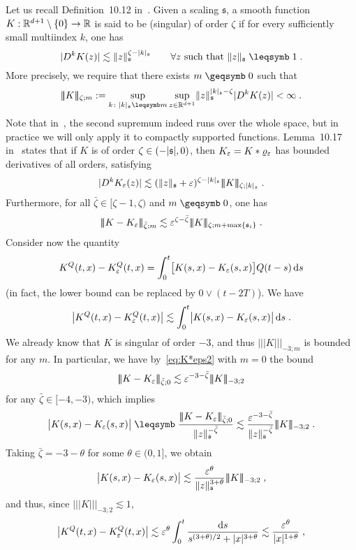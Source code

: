 \documentclass[reqno,11pt]{article}
\def\normDgamma#1{|\!|\!|#1|\!|\!|}
\def\KQ{K^Q}
\def\fraks{\mathfrak{s}}
\begin{document}
Let us recall Definition~10.12 in~\cite{Hairer2014}. Given a scaling
$\fraks$, a smooth function $K: \mathbb{R}^{d+1}\setminus\{0\}\to\mathbb{R}$ is said to be
(singular) of order $\zeta$ if for every sufficiently small multiindex $k$, one
has 
\[
 \abs{D^k K(z)} \lesssim \norm{z}_\fraks^{\zeta - \abs{k}_\fraks}
 \qquad
 \forall z \text{ such that } \norm{z}_\fraks \leqs 1\;.
\]
More precisely, we require that there exists $m\geqs0$ such that 
\[
 \normDgamma{K}_{\zeta;m} := \sup_{k\colon\abs{k}_\fraks \leqs m} 
 \sup_{z\in\R^{d+1}} \norm{z}_\fraks^{\abs{k}_\fraks - \zeta} \abs{D^k K(z)} <
\infty\;.
\]
Note that in~\cite[Def~10.12]{Hairer2014}, the second supremum indeed runs over
the whole space, but in practice we will only apply it to compactly supported
functions. 
Lemma~10.17 in~\cite{Hairer2014} states that if $K$ is of order
$\zeta\in(-\abs{\fraks},0)$, then $K_\varepsilon=K*\varrho_\varepsilon$ has  bounded
derivatives of all orders, satisfying 
\[
 \abs{D^k K_\eps(z)} \lesssim (\norm{z}_\fraks + \eps)^{\zeta-\abs{k}_\fraks}
\normDgamma{K}_{\zeta;\abs{k}_\fraks}\;.
\]
Furthermore, for all $\bar\zeta\in[\zeta-1,\zeta)$ and $m\geqs0$, one has 
\begin{equation}
 \label{eq:K*eps2}
 \normDgamma{K-K_\eps}_{\bar\zeta;m} 
 \lesssim \eps^{\zeta-\bar\zeta} \normDgamma{K}_{\zeta;m+\max\set{\fraks_i}}\;. 
\end{equation} 
%
Consider now the quantity 
\[
 \KQ(t,x) - \KQ_\eps(t,x) 
 = \int_0^t \bigbrak{K(s,x) - K_\eps(s,x)}Q(t-s)\6s 
\]
(in fact, the lower bound can be replaced by $0\vee(t-2T)$). We have 
\[
 \bigabs{\KQ(t,x) - \KQ_\eps(t,x)}
 \lesssim \int_0^t \bigabs{K(s,x) - K_\eps(s,x)}\6s\;. 
\]
We already know that $K$ is singular of order $-3$, and thus 
$\normDgamma{K}_{-3;m}$ is bounded for any $m$. In particular, we have
by~\eqref{eq:K*eps2} with $m=0$ the bound 
\[
 \normDgamma{K-K_\eps}_{\bar\zeta;0} 
 \lesssim \eps^{-3-\bar\zeta} \normDgamma{K}_{-3;2} 
\]
for any $\bar\zeta\in[-4,-3)$, 
which implies 
\[
 \bigabs{K(s,x) - K_\eps(s,x)}
 \leqs \frac{\normDgamma{K-K_\eps}_{\bar\zeta;0}}{\norm{z}_\fraks^{-\bar\zeta}}
 \lesssim \frac{\eps^{-3-\bar\zeta}}{\norm{z}_\fraks^{-\bar\zeta}} 
 \normDgamma{K}_{-3;2}\;.
\]
Taking $\bar\zeta=-3-\theta$ for some $\theta\in(0,1]$, we obtain 
\[
 \bigabs{K(s,x) - K_\eps(s,x)}
 \lesssim \frac{\eps^\theta}{\norm{z}_\fraks^{3+\theta}} 
 \normDgamma{K}_{-3;2}\;,
\]
and thus, since $\normDgamma{K}_{-3;2}\lesssim 1$, 
\[
 \bigabs{\KQ(t,x) - \KQ_\eps(t,x)}
 \lesssim \eps^\theta\int_0^t \frac{\6s}{s^{(3+\theta)/2} +
\abs{x}^{3+\theta}}
 \lesssim \frac{\eps^\theta}{\abs{x}^{1+\theta}}\;,
\]
\end{document}
